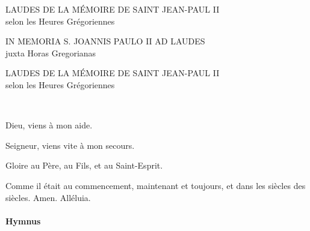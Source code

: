 \documentclass[twoside]{article}
\begin{document}
\null\vfill
\begin{center}\begin{doublespace}

{
\MakeUppercase{\Large Laudes de la mémoire de Saint Jean-Paul II}\\
selon les Heures Grégoriennes

}
\end{doublespace}\end{center}
\vfill

\newpage

\begin{paracol}[1]{2}

\begin{center}\begin{doublespace}

{

\MakeUppercase{\Large In memoria S. Joannis Paulo II ad Laudes}\\
juxta Horas Gregorianas

}
\end{doublespace}\end{center}


\switchcolumn

\begin{center}\begin{doublespace}

{
\MakeUppercase{\Large Laudes de la mémoire de Saint Jean-Paul II}\\
selon les Heures Grégoriennes

}
\end{doublespace}\end{center}

~~

\vv Dieu, viens à mon aide.

\rr Seigneur, viens vite à mon secours.

\vv Gloire au Père, au Fils, et au Saint-Esprit.

\rr Comme il était au commencement, maintenant et toujours, et dans les siècles des siècles. Amen. Alléluia.

\switchcolumn*


\paragraph{Hymnus}


\end{paracol}
\end{document}
